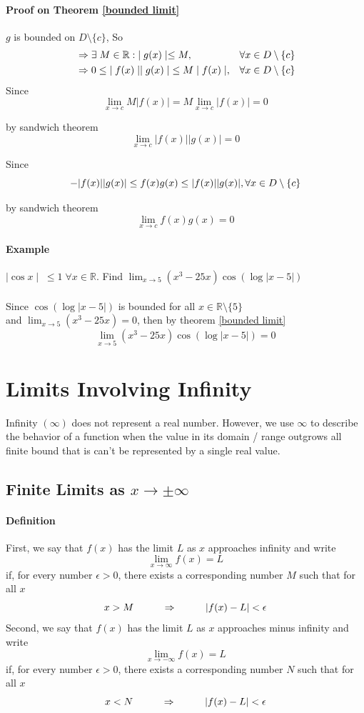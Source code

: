 \documentclass[12pt]{article}
\newcommand\tab[1][1cm]{\hspace*{#1}}
\begin{document}
\paragraph{Proof on Theorem \ref{bounded limit}} $g$ is bounded on $D \setminus \{c\}$, So
\begin{align*} 
    &\Rightarrow \exists \; M \in \mathbb{R} : \; \mid g(x) \mid \leq M, \textrm{\tab} &\forall x \in D \setminus \{c\} \\
    &\Rightarrow 0 \leq \; \mid f(x)\mid \mid g(x)\mid \; \leq M \mid f(x)\mid, &\forall x \in D \setminus \{c\} \\
\end{align*}
\noindent
Since
\[
    \lim_{x \to c} M|f(x)| = M \lim_{x \to c} |f(x)| = 0
\]

\noindent
by sandwich theorem
\[
    \lim_{x \to c} |f(x)||g(x)|= 0
\]

\noindent
Since
\[
    - |f(x)||g(x)| \leq f(x)g(x) \leq |f(x)||g(x)|, \forall x \in D \setminus \{c\} \\
\]

\noindent
by sandwich theorem
\[
    \lim_{x \to c} f(x)g(x)= 0
\]

\paragraph{Example} $\mid \cos x \mid \; \leq 1 \; \forall x \in \mathbb{R}$. Find $\lim_{x \to 5} (x^3 - 25x) \cos{(\log|x-5|)}$ \\ \\
Since $\cos{(\log|x-5|)}$ is bounded for all $x \in \mathbb{R} \setminus \{5\}$ \\
and  $\lim_{x \to 5} (x^3 - 25x) = 0$, then by theorem \ref{bounded limit}
\[
    \lim_{x \to 5} (x^3 - 25x) \cos{(\log|x-5|)} = 0
\]

\section{Limits Involving Infinity}
Infinity $(\infty)$ does not represent a real number. However, we use $\infty$ to describe the behavior 
of a function when the value in its domain / range outgrows all finite bound that is can't be represented by 
a single real value.
\subsection{Finite Limits as $x \to \pm \infty$}
\paragraph{Definition} First, we say that $f(x)$ has the limit $L$ as $x$ approaches infinity and write
\[
    \lim_{x \to \infty} f(x) = L
\]
if, for every number $\epsilon > 0$, there exists a corresponding number $M$ such that for all $x$
\[ 
    x > M \textrm{\tab} \Rightarrow \textrm{\tab} |f(x) - L| < \epsilon
\]
Second, we say that $f(x)$ has the limit $L$ as $x$ approaches minus infinity and write
\[
    \lim_{x \to -\infty} f(x) = L
\]
if, for every number $\epsilon > 0$, there exists a corresponding number $N$ such that for all $x$
\[ 
    x < N \textrm{\tab} \Rightarrow \textrm{\tab} |f(x) - L| < \epsilon
\]
\end{document}
